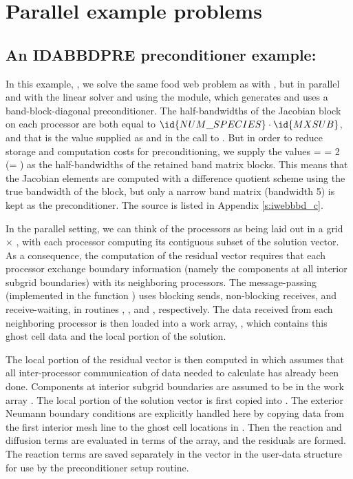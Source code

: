 \section{Parallel example problems}\label{s:ex_parallel}

\subsection{An IDABBDPRE preconditioner example: }\label{ss:iwebbbd}

In this example, , we solve the same food web problem as with
, but in parallel and with the {\idaspgmr} linear solver and
using the {\idabbdpre} module, which generates and uses a band-block-diagonal 
preconditioner.  
The half-bandwidths of the Jacobian block on each processor are both equal to
$\id{NUM\_SPECIES}\cdot\id{MXSUB}$, and that is the value supplied as  and 
in the call to .  But in order to reduce storage and computation
costs for preconditioning, we supply the values  =  = 2
(= ) as the half-bandwidths of the retained band matrix blocks.
This means that the Jacobian elements are computed with a difference quotient
scheme using the true bandwidth of the block, but only a narrow band matrix
(bandwidth 5) is kept as the preconditioner.  The source is listed in
Appendix \ref{s:iwebbbd_c}. 

In the parallel setting, we can think of the processors as being laid out
in a grid  $\times$ , with each processor computing its
contiguous subset of the solution vector. As a consequence, the computation 
of the residual vector requires that each processor exchange boundary information
(namely the components at all interior subgrid boundaries) with its neighboring processors.
The message-passing (implemented in the function ) uses blocking sends, 
non-blocking receives, and receive-waiting, in routines , ,
and , respectively.
The data received from each neighboring processor is then loaded into a work array,
, which contains this ghost cell data and the local portion of the solution.

The local portion of the residual vector is then computed in  which
assumes that all inter-processor communication of data
needed to calculate  has already been done.  Components at interior
subgrid boundaries are assumed to be in the work array .
The local portion of the solution vector  is first copied into .
The exterior Neumann boundary conditions are explicitly handled here
by copying data from the first interior mesh line to the ghost cell
locations in .  Then the reaction and diffusion terms are
evaluated in terms of the  array, and the residuals are formed.
The reaction terms are saved separately in the vector  in the user-data
structure  for use by the preconditioner setup routine. 

